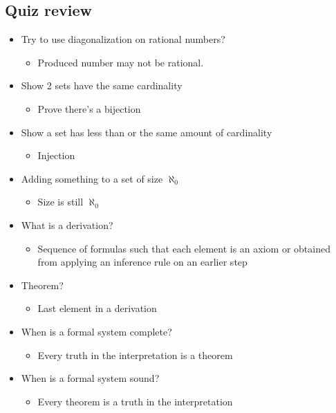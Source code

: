 \documentclass[11pt]{article}
\begin{document}
\subsection{Quiz review}
\label{sec:org298b088}
\begin{itemize}
\item Try to use diagonalization on rational numbers?
\begin{itemize}
\item Produced number may not be rational.
\end{itemize}
\item Show 2 sets have the same cardinality
\begin{itemize}
\item Prove there's a bijection
\end{itemize}
\item Show a set has less than or the same amount of cardinality
\begin{itemize}
\item Injection
\end{itemize}
\item Adding something to a set of size \(\aleph_0\)
\begin{itemize}
\item Size is still \(\aleph_0\)
\end{itemize}
\item What is a derivation?
\begin{itemize}
\item Sequence of formulas such that each element is an axiom or obtained from applying an inference rule on an earlier step
\end{itemize}
\item Theorem?
\begin{itemize}
\item Last element in a derivation
\end{itemize}
\item When is a formal system complete?
\begin{itemize}
\item Every truth in the interpretation is a theorem
\end{itemize}
\item When is a formal system sound?
\begin{itemize}
\item Every theorem is a truth in the interpretation
\end{itemize}
\end{itemize}
\end{document}

